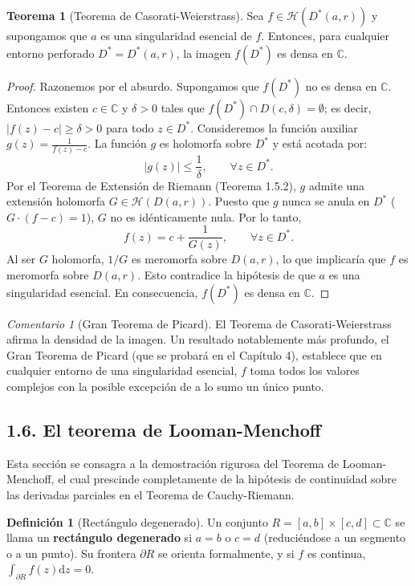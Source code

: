 \documentclass[11pt,a4paper]{article}
\theoremstyle{definition}
\newtheorem{definicion}{Definición}[section]
\newtheorem{teorema}{Teorema}[section]
\theoremstyle{remark}
\newtheorem{observacion}{Comentario}[section]
\numberwithin{equation}{section}
\newcommand{\dz}{\mathrm{d}z}
\begin{document}
\begin{teorema}[Teorema de Casorati-Weierstrass]
Sea $f \in \mathcal{H}(D^*(a,r))$ y supongamos que $a$ es una singularidad esencial de $f$. Entonces, para cualquier entorno perforado $D^* = D^*(a,r)$, la imagen $f(D^*)$ es densa en $\mathbb{C}$.
\end{teorema}
\begin{proof}
Razonemos por el absurdo. Supongamos que $f(D^*)$ no es densa en $\mathbb{C}$. Entonces existen $c \in \mathbb{C}$ y $\delta > 0$ tales que $f(D^*) \cap D(c,\delta) = \emptyset$; es decir, $|f(z) - c| \ge \delta > 0$ para todo $z \in D^*$.
Consideremos la función auxiliar $g(z) = \frac{1}{f(z) - c}$. La función $g$ es holomorfa sobre $D^*$ y está acotada por:
\[
|g(z)| \le \frac{1}{\delta}, \qquad \forall z \in D^*.
\]
Por el Teorema de Extensión de Riemann (Teorema 1.5.2), $g$ admite una extensión holomorfa $G \in \mathcal{H}(D(a,r))$. Puesto que $g$ nunca se anula en $D^*$ ($G \cdot (f-c) = 1$), $G$ no es idénticamente nula. Por lo tanto,
\[
f(z) = c + \frac{1}{G(z)}, \qquad \forall z \in D^*.
\]
Al ser $G$ holomorfa, $1/G$ es meromorfa sobre $D(a,r)$, lo que implicaría que $f$ es meromorfa sobre $D(a,r)$. Esto contradice la hipótesis de que $a$ es una singularidad esencial. En consecuencia, $f(D^*)$ es densa en $\mathbb{C}$.
\end{proof}

\begin{observacion}[Gran Teorema de Picard]
El Teorema de Casorati-Weierstrass afirma la densidad de la imagen. Un resultado notablemente más profundo, el Gran Teorema de Picard (que se probará en el Capítulo 4), establece que en cualquier entorno de una singularidad esencial, $f$ toma todos los valores complejos con la posible excepción de a lo sumo un único punto.
\end{observacion}

\subsection{1.6. El teorema de Looman-Menchoff}

Esta sección se consagra a la demostración rigurosa del Teorema de Looman-Menchoff, el cual prescinde completamente de la hipótesis de continuidad sobre las derivadas parciales en el Teorema de Cauchy-Riemann.

\begin{definicion}[Rectángulo degenerado]
Un conjunto $R = [a,b] \times [c,d] \subset \mathbb{C}$ se llama un \textbf{rectángulo degenerado} si $a = b$ o $c = d$ (reduciéndose a un segmento o a un punto). Su frontera $\partial R$ se orienta formalmente, y si $f$ es continua, $\int_{\partial R} f(z) \dz = 0$.
\end{definicion}
\end{document}
